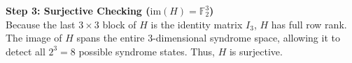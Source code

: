 \documentclass[11pt, a4paper, twoside]{article}
\newcommand{\F}{\mathbb{F}}
\newcommand{\im}{\text{im}}
\begin{document}
\begin{proofbox}
		\vspace{1em}
		\textbf{Step 3: Surjective Checking ($\im(H) = \F_2^3$)}\\
		Because the last $3 \times 3$ block of $H$ is the identity matrix $I_3$, $H$ has full row rank. The image of $H$ spans the entire 3-dimensional syndrome space, allowing it to detect all $2^3 = 8$ possible syndrome states. Thus, $H$ is surjective.
	\end{proofbox}
	
\end{document}
